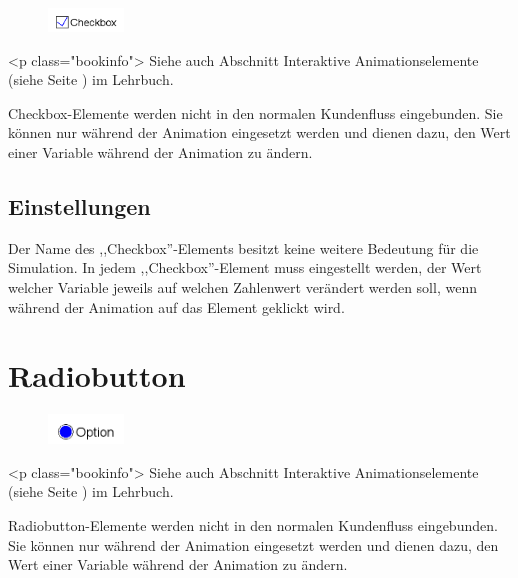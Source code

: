 \begin{figure}
\vspace{-22pt}
\includegraphics[width=2cm]{imageModelElementInteractiveCheckbox.png}
\vspace{-22pt}
\end{figure}

<p class="bookinfo">
Siehe auch Abschnitt Interaktive Animationselemente (siehe Seite \pageref{ref:book:8.12.4}) im Lehrbuch.

Checkbox-Elemente werden nicht in den normalen Kundenfluss eingebunden.
Sie können nur während der Animation eingesetzt werden und dienen dazu,
den Wert einer Variable während der Animation zu ändern.

\subsection*{Einstellungen}

Der Name des ,,Checkbox''-Elements besitzt keine weitere Bedeutung für die Simulation.
In jedem ,,Checkbox''-Element muss eingestellt werden, der Wert welcher Variable
jeweils auf welchen Zahlenwert verändert werden soll, wenn während der Animation
auf das Element geklickt wird.


\section{Radiobutton}
\label{ref:ModelElementInteractiveRadiobutton}

\begin{figure}
\vspace{-22pt}
\includegraphics[width=2cm]{imageModelElementInteractiveRadiobutton.png}
\vspace{-22pt}
\end{figure}

<p class="bookinfo">
Siehe auch Abschnitt Interaktive Animationselemente (siehe Seite \pageref{ref:book:8.12.4}) im Lehrbuch.

Radiobutton-Elemente werden nicht in den normalen Kundenfluss eingebunden.
Sie können nur während der Animation eingesetzt werden und dienen dazu,
den Wert einer Variable während der Animation zu ändern.


